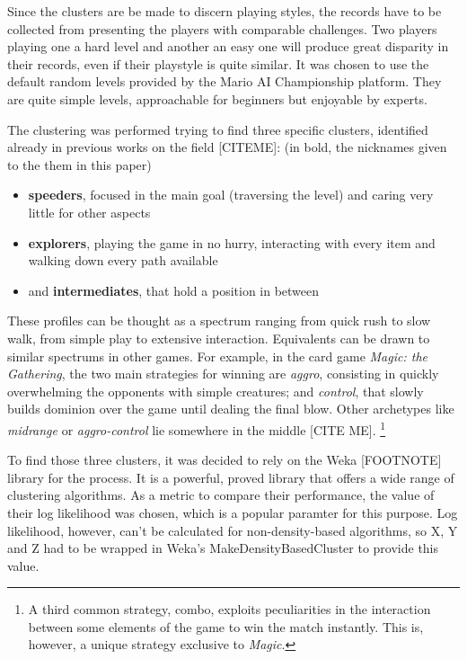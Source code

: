 \documentclass[conference]{IEEEtran}
\begin{document}
Since the clusters are be made to discern playing styles, the records have to be collected from presenting the players with comparable challenges. Two players playing one a hard level and another an easy one will produce great disparity in their records, even if their playstyle is quite similar. It was chosen to use the default random levels provided by the Mario AI Championship platform. They are quite simple levels, approachable for beginners but enjoyable by experts.

The clustering was performed trying to find three specific clusters, identified already in previous works on the field [CITEME]: (in bold, the nicknames given to the them in this paper)

\begin{itemize}
	
	\item \textbf{speeders}, focused in the main goal (traversing the level) and caring very little for other aspects
	
	\item \textbf{explorers}, playing the game in no hurry, interacting with every item and walking down every path available
	
	\item and \textbf{intermediates}, that hold a position in between
	
\end{itemize}

These profiles can be thought as a spectrum ranging from quick rush to slow walk, from simple play to extensive interaction. Equivalents can be drawn to similar spectrums in other games. For example, in the card game \textit{Magic: the Gathering}, the two main strategies for winning are \textit{aggro}, consisting in quickly overwhelming the opponents with simple creatures; and \textit{control}, that slowly builds dominion over the game until dealing the final blow. Other archetypes like \textit{midrange} or \textit{aggro-control} lie somewhere in the middle [CITE ME]. \footnote{A third common strategy, combo, exploits peculiarities in the interaction between some elements of the game to win the match instantly. This is, however, a unique strategy exclusive to \textit{Magic}. } 

To find those three clusters, it was decided to rely on the Weka [FOOTNOTE] library for the process. It is a powerful, proved library that offers a wide range of clustering algorithms. As a metric to compare their performance, the value of their log likelihood was chosen, which is a popular paramter for this purpose. Log likelihood, however, can't be calculated for non-density-based algorithms, so X, Y and Z had to be wrapped in Weka's MakeDensityBasedCluster to provide this value.
\end{document}
